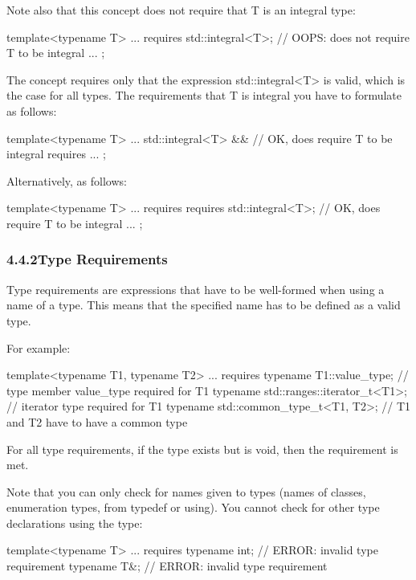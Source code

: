Note also that this concept does not require that T is an integral type:

\begin{cpp}
template<typename T>
... requires {
		std::integral<T>; // OOPS: does not require T to be integral
		...
	};
\end{cpp}

The concept requires only that the expression std::integral<T> is valid, which is the case for all types. The requirements that T is integral you have to formulate as follows:

\begin{cpp}
template<typename T>
... std::integral<T> && // OK, does require T to be integral
	requires {
		...
	};
\end{cpp}

Alternatively, as follows:

\begin{cpp}
template<typename T>
... requires {
		requires std::integral<T>; // OK, does require T to be integral
		...
	};
\end{cpp}

\subsubsection*{ 4.4.2\hspace{0.2cm}Type Requirements}

Type requirements are expressions that have to be well-formed when using a name of a type. This means that the specified name has to be defined as a valid type.

For example:

\begin{cpp}
template<typename T1, typename T2>
... requires {
	typename T1::value_type; // type member value_type required for T1
	typename std::ranges::iterator_t<T1>; // iterator type required for T1
	typename std::common_type_t<T1, T2>; // T1 and T2 have to have a common type
}
\end{cpp}

For all type requirements, if the type exists but is void, then the requirement is met.

Note that you can only check for names given to types (names of classes, enumeration types, from typedef or using). You cannot check for other type declarations using the type:

\begin{cpp}
template<typename T>
... requires {
	typename int; // ERROR: invalid type requirement
	typename T&; // ERROR: invalid type requirement
}
\end{cpp}

